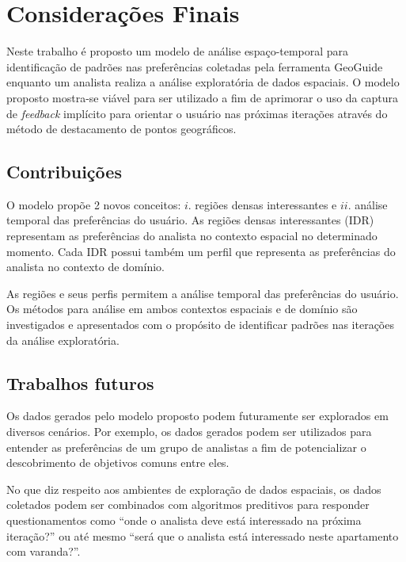 \chapter{Considerações Finais}
\label{chap:conclusao}

Neste trabalho é proposto um modelo de análise espaço-temporal para identificação de padrões nas preferências coletadas pela ferramenta GeoGuide enquanto um analista realiza a análise exploratória de dados espaciais. O modelo proposto mostra-se viável para ser utilizado a fim de aprimorar o uso da captura de {\em feedback} implícito para orientar o usuário nas próximas iterações através do método de destacamento de pontos geográficos.

\section{Contribuições}

O modelo propõe 2 novos conceitos: $i$. regiões densas interessantes e $ii$. análise temporal das preferências do usuário. As regiões densas interessantes (IDR) representam as preferências do analista no contexto espacial no determinado momento. Cada IDR possui também um perfil que representa as preferências do analista no contexto de domínio.

As regiões e seus perfis permitem a análise temporal das preferências do usuário. Os métodos para análise em ambos contextos espaciais e de domínio são investigados e apresentados com o propósito de identificar padrões nas iterações da análise exploratória.

\section{Trabalhos futuros}

Os dados gerados pelo modelo proposto podem futuramente ser explorados em diversos cenários. Por exemplo, os dados gerados podem ser utilizados para entender as preferências de um grupo de analistas a fim de potencializar o descobrimento de objetivos comuns entre eles.

No que diz respeito aos ambientes de exploração de dados espaciais, os dados coletados podem ser combinados com algoritmos preditivos para responder questionamentos como ``onde o analista deve está interessado na próxima iteração?'' ou até mesmo ``será que o analista está interessado neste apartamento com varanda?''.  